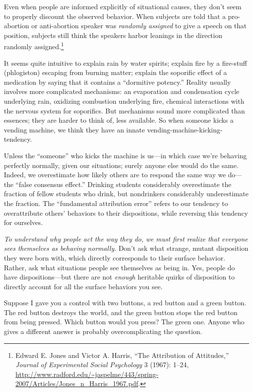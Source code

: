 {
 Even when people are informed explicitly of situational causes,
they don't seem to properly discount the observed
behavior. When subjects are told that a pro-abortion or anti-abortion
speaker was \textit{randomly assigned} to give a speech on that
position, subjects still think the speakers harbor leanings in the
direction randomly assigned.\footnote{Edward E. Jones and Victor A. Harris, ``The
Attribution of Attitudes,'' \textit{Journal of
Experimental Social Psychology} 3 (1967): 1--24,
\url{http://www.radford.edu/\~jaspelme/443/spring-2007/Articles/Jones\_n\_Harris\_1967.pdf}.}}

{
 It seems quite intuitive to explain rain by water spirits; explain
fire by a fire-stuff (phlogiston) escaping from burning matter; explain
the soporific effect of a medication by saying that it contains a
``dormitive potency.'' Reality
usually involves more complicated mechanisms: an evaporation and
condensation cycle underlying rain, oxidizing combustion underlying
fire, chemical interactions with the nervous system for soporifics. But
mechanisms sound more complicated than essences; they are harder to
think of, less available. So when someone kicks a vending machine, we
think they have an innate vending-machine-kicking-tendency.}

{
 Unless the ``someone'' who
kicks the machine is us---in which case we're behaving
perfectly normally, given our situations; surely anyone else would do
the same. Indeed, we overestimate how likely others are to respond the
same way we do---the ``false consensus
effect.'' Drinking students considerably overestimate
the fraction of fellow students who drink, but nondrinkers considerably
underestimate the fraction. The ``fundamental
attribution error'' refers to our tendency to
overattribute others' behaviors to their dispositions,
while reversing this tendency for ourselves.}

{
 \textit{To understand why people act the way they do, we must
first realize that everyone sees themselves as behaving normally.}
Don't ask what strange, mutant disposition they were
born with, which directly corresponds to their surface behavior.
Rather, ask what situations people see themselves as being in. Yes,
people do have dispositions---but there are not \textit{enough}
heritable quirks of disposition to directly account for all the surface
behaviors you see.}

{
 Suppose I gave you a control with two buttons, a red button and a
green button. The red button destroys the world, and the green button
stops the red button from being pressed. Which button would you press?
The green one. Anyone who gives a different answer is probably
overcomplicating the question.}

